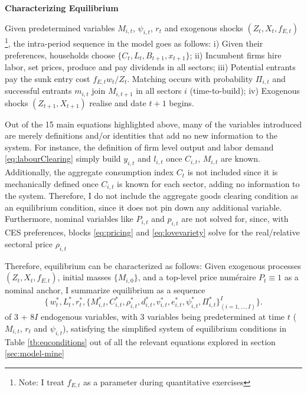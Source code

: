 \documentclass[a4paper,12pt]{article} %
\numberwithin{equation}{section} %
\numberwithin{figure}{section}
\numberwithin{table}{section}
\begin{document}
\medskip
\medskip
\noindent\textbf{Characterizing Equilibrium}
\medskip

Given predetermined variables $M_{i,t}$, $\psi_{i,t}$, $r_t$ and exogenous shocks $(Z_{t},X_{t}, f_{E,t})$\footnote{Note: I treat 
$f_{E,t}$ as a parameter during quantitative exercises}, the intra-period sequence in the model goes as follows: i) Given their preferences, households
choose $\{C_t,L_t,B_{t+1},x_{t+1}\}$; ii) Incumbent firms hire labor, set prices, produce and pay dividends in all sectors;
iii) Potential entrants pay the sunk entry cost $f_{E,t}w_t/Z_t$.  Matching occurs with probability $\Pi_{i,t}$ and 
successful entrants $m_{i,t}$ join $M_{i,t+1}$ in all sectors $i$ (time-to-build); iv) Exogenous shocks $(Z_{t+1},X_{t+1})$ realise and 
date $t{+}1$ begins.

Out of the 15 main equations highlighted above, many of the variables introduced are merely definitions and/or identities that add no new 
information to the system. 
For instance, the definition of firm level output and labor demand \eqref{eq:labourClearing} simply build $y_{i,t}$ and $l_{i,t}$ 
once \( C_{i,t} \), \( M_{i,t} \) are known. Additionally, the aggregate consumption index $C_t$ is not included since it is mechanically 
defined once $C_{i,t}$ is known for each sector, adding no information to the system. Therefore, I do not include 
the aggregate goods clearing condition as an equilibrium condition, since it does not pin down any additional variable.
Furthermore, nominal variables like $P_{i,t}$ and $p_{i,t}$ are not solved for, since, with CES preferences, blocks 
\eqref{eq:pricing} and \eqref{eq:lovevariety} solve for the real/relative sectoral price $\rho_{i,t}$


Therefore, equilibrium can be characterized as follows: Given exogenous processes $(Z_t,X_t,f_{E,t})$, initial masses $\{M_{i,0}\}$, 
and a top-level price numéraire $P_t \equiv 1$ as a nominal anchor, I summarize equilibrium as a sequence 
\[
\bigl\{\,w_t^*,L_t^*,r_{t}^*,\bigl\{
        M_{i,t}^*,C_{i,t}^*,\rho_{i,t}^*,d_{i,t}^*,v_{i,t}^*,e_{i,t}^*,\psi_{i,t}^*,\Pi_{i,t}^*\bigr\}^I_{(i=1,\dots,I)}\bigr\}.
\]
of 3 + 8$I$ endogenous variables, with 3 variables being predetermined at time $t$ ($M_{i,t}$, $r_t$ and $\psi_{i,t}$), 
satisfying the simplified system of equilibrium conditions in Table \ref{tb:eqconditions} out of all the relevant equations explored in section \ref{sec:model-mine}
\end{document}
